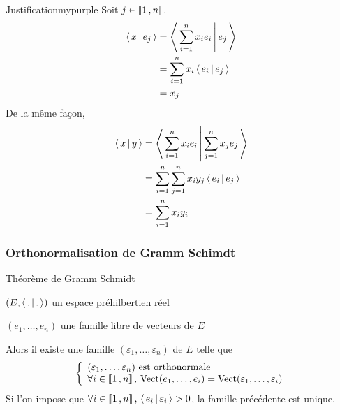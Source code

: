         \begin{demo}{Justification}{mypurple}
            Soit $j \in \left\llbracket 1 \, , n \right\rrbracket$. 
            \begin{align*}
                \left<\,x\,\middle|\,e_j\,\right> &= \left<\,\sum_{i=1}^{n} x_i e_i\,\middle|\,e_j\,\right> \\
                &= \sum_{i=1}^{n} x_i \left<\,e_i\,\middle|\,e_j\,\right> \\
                &= x_j 
            \end{align*}
            De la même façon, 
            \begin{align*}
                \left<\,x\,\middle|\,y\,\right> 
                &= \left<\,\sum_{i=1}^{n} x_i e_i\,\middle|\,\sum_{j=1}^{n} x_j e_j\,\right> \\
                &= \sum_{i=1}^{n} \sum_{j = 1}^{n} x_i y_j \left<\,e_i\,\middle|\,e_j\,\right> \\
                &= \sum_{i=1}^{n} x_i y_i
            \end{align*}
        \end{demo}

        \subsubsection{Orthonormalisation de Gramm Schimdt}

        \begin{theo}{Théorème de Gramm Schmidt}{}
            \begin{soient}
                \item $(E,\left<\,.\,\middle|\,.\,\right>)$ un espace préhilbertien réel
                \item $(e_1,\ldots,e_n)$ une famille libre de vecteurs de $E$
            \end{soient}
            Alors il existe une famille $(\varepsilon_1,\ldots,\varepsilon_n)$ de $E$ telle que \[ \et{(\varepsilon_1,\ldots,\varepsilon_n) \text{ est orthonormale}}{\forall i \in \intervalleEntier{1}{n}, \, \Vect(e_1,\ldots,e_i) = \Vect(\varepsilon_1,\ldots,\varepsilon_i)} \] 
            Si l’on impose que $\forall i \in \left\llbracket 1 \, , n \right\rrbracket, \, \left<\,e_i\,\middle|\,\varepsilon_i\,\right> > 0$, la famille précédente est unique.
        \end{theo}

